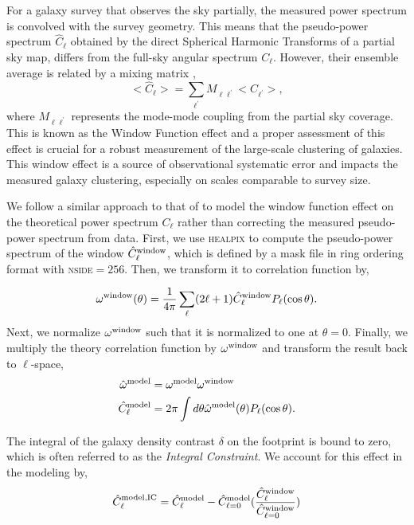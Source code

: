 For a galaxy survey that observes the sky partially, the measured power spectrum is convolved with the survey geometry. This means that the pseudo-power spectrum $\hat{C}_{\ell}$ obtained by the direct Spherical Harmonic Transforms of a partial sky map, differs from the full-sky angular spectrum $C_{\ell}$. However, their ensemble average is related by a mixing matrix \citep{hivon2002master}, 
\begin{equation}
    <\hat{C}_{\ell}> = \sum_{\ell^{\prime}} M_{\ell \ell^{\prime}}<C_{\ell^{\prime}}>,
\end{equation}
where $M_{\ell \ell^{\prime}}$ represents the mode-mode coupling from the partial sky coverage. This is known as the Window Function effect and a proper assessment of this effect is crucial for a robust measurement of the large-scale clustering of galaxies. This window effect is a source of observational systematic error and impacts the measured galaxy clustering, especially on scales comparable to survey size.

We follow a similar approach to that of \cite{chon2004fast} to model the window function effect on the theoretical power spectrum $C_{\ell}$ rather than correcting the measured pseudo-power spectrum from data. First, we use \textsc{healpix} to compute the pseudo-power spectrum of the window $\hat{C}^{\rm window}_{\ell}$, which is defined by a mask file in ring ordering format with \textsc{nside}$=256$. Then, we transform it to correlation function by,

\begin{equation}
    \omega^{\rm window} (\theta) = \frac{1}{4\pi}\sum_{\ell} (2\ell+1) \hat{C}^{\rm window}_{\ell} P_{\ell}(\cos \theta).
\end{equation}
Next, we normalize $\omega^{\rm window}$ such that it is normalized to one at $\theta=0$. Finally, we multiply the theory correlation function by $\omega^{\rm window}$ and transform the result back to $\ell$-space,%
\begin{align}
    \hat{\omega}^{\rm model} &= \omega^{\rm model} \omega^{\rm window} \\
    \hat{C}^{\rm model}_{\ell} &= 2\pi \int d\theta \hat{\omega}^{\rm model}(\theta)P_{\ell}(\cos \theta).
\end{align}

The integral of the galaxy density contrast $\delta$ on the footprint is bound to zero, which is often referred to as the \textit{Integral Constraint}. We account for this effect in the modeling by,
\begin{equation}
     \hat{C}^{\rm model, IC}_{\ell} = \hat{C}^{\rm model}_{\ell} - \hat{C}^{\rm model}_{\ell=0} (\frac{\hat{C}^{\rm window}_{\ell}}{\hat{C}^{\rm window}_{\ell=0}})
\end{equation}

